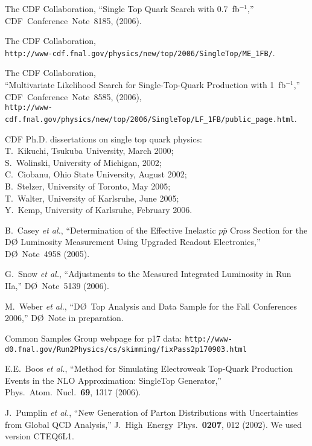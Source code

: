 \documentclass[aps]{revtex4}
\newcommand{\dzero}     {D\O}
\newcommand{\ppbar}     {\mbox{$p\bar{p}$}}
\begin{document}
\begin{thebibliography}{99.}
The CDF Collaboration,
``Single Top Quark Search with 0.7~fb$^{-1}$,''
CDF~Conference~Note~8185, (2006).

The CDF Collaboration,\\
\texttt{http://www-cdf.fnal.gov/physics/new/top/2006/SingleTop/ME\_1FB/}.

The CDF Collaboration,\\
``Multivariate Likelihood Search for Single-Top-Quark Production with
1~fb$^{-1}$,''
CDF~Conference~Note~8585, (2006),\\
\texttt{http://www-cdf.fnal.gov/physics/new/top/2006/SingleTop/LF\_1FB/public\_page.html}.

CDF Ph.D. dissertations on single top quark physics:\\
T.~Kikuchi, Tsukuba University, March 2000;\\
S.~Wolinski, University of Michigan, 2002;\\
C.~Ciobanu, Ohio State University, August 2002;\\
B.~Stelzer, University of Toronto, May 2005;\\
T.~Walter, University of Karlsruhe, June 2005;\\
Y.~Kemp, University of Karlsruhe, February 2006.

B.~Casey {\it et al.},
``Determination of the Effective Inelastic {\ppbar} Cross Section
for the {\dzero} Luminosity Measurement Using Upgraded Readout
Electronics,''
{\dzero}~Note~4958 (2005).

G.~Snow {\it et al.},
``Adjustments to the Measured Integrated Luminosity in Run IIa,''
{\dzero}~Note~5139 (2006).

M.~Weber {\it et al.},
``{\dzero}~Top Analysis and Data Sample for the Fall Conferences
2006,''
{\dzero}~Note in preparation.

Common Samples Group webpage for p17 data:
\texttt{http://www-d0.fnal.gov/Run2Physics/cs/skimming/fixPass2p170903.html}

E.E.~Boos {\it et al.},
``Method for Simulating Electroweak Top-Quark Production Events in
the NLO Approximation: SingleTop Generator,''
Phys.\ Atom.\ Nucl.~{\bf 69}, 1317 (2006).

J.~Pumplin {\it et al.},
``New Generation of Parton Distributions with Uncertainties from
Global QCD Analysis,''
J.\ High~Energy~Phys.~{\bf 0207}, 012 (2002). We used version CTEQ6L1.


\end{thebibliography}
\end{document}
